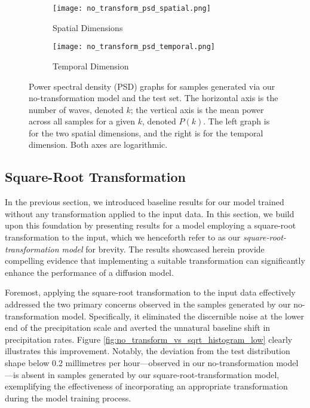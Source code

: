 \documentclass[ oneside,%
                    author={George Herbert},
                    degree={MSci},
                     title={Diffusion Models for Time-Evolving Precipitation Fields},
                  subtitle={}]{dissertation}
\begin{document}
\begin{figure}[htbp]
      \centering
      \begin{subfigure}{0.49\textwidth}
            \texttt{[image: no\_transform\_psd\_spatial.png]}
            \caption{Spatial Dimensions}
      \end{subfigure}
      \begin{subfigure}{0.49\textwidth}
            \texttt{[image: no\_transform\_psd\_temporal.png]}
            \caption{Temporal Dimension}
      \end{subfigure}
      \caption{Power spectral density (PSD) graphs for samples generated via our no-transformation model and the test set. The horizontal axis is the number of waves, denoted $k$; the vertical axis is the mean power across all samples for a given $k$, denoted $P(k)$. The left graph is for the two spatial dimensions, and the right is for the temporal dimension. Both axes are logarithmic.}
      \label{fig:no_transform_psd}
\end{figure}

\subsection{Square-Root Transformation}
\label{sec:results_square_root}

In the previous section, we introduced baseline results for our model trained without any transformation applied to the input data. In this section, we build upon this foundation by presenting results for a model employing a square-root transformation to the input, which we henceforth refer to as our \textit{square-root-transformation model} for brevity. The results showcased herein provide compelling evidence that implementing a suitable transformation can significantly enhance the performance of a diffusion model.

Foremost, applying the square-root transformation to the input data effectively addressed the two primary concerns observed in the samples generated by our no-transformation model. Specifically, it eliminated the discernible noise at the lower end of the precipitation scale and averted the unnatural baseline shift in precipitation rates. Figure \ref{fig:no_transform_vs_sqrt_histogram_low} clearly illustrates this improvement. Notably, the deviation from the test distribution shape below 0.2 millimetres per hour---observed in our no-transformation model---is absent in samples generated by our square-root-transformation model, exemplifying the effectiveness of incorporating an appropriate transformation during the model training process.
\end{document}
